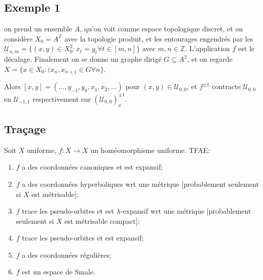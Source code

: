 \documentclass{amsart}
\begin{document}
\subsection{Exemple 1}
on prend un ensemble $A$, qu'on voit comme espace topologique discret, et on consid\`ere $X_0=A^{\mathbb Z}$ avec la topologie produit, et les entourages engendr\'es par les $\mathcal U_{n,m}=\{(x,y)\in X_0^2:x_t=y_t\forall t\in[m,n]\}$ avec $m,n\in\mathbb Z$. L'application $f$ est le d\'ecalage. Finalement on se donne un graphe dirig\'e $G\subseteq A^2$, et on regarde $X=\{x\in X_0:(x_n,x_{n+1}\in G\forall n\}$.

Alors $[x,y]=(\dots,y_{-1},y_0,x_1,x_2,\dots)$ pour $(x,y)\in\mathcal U_{0,0}$, et $f^{\pm1}$ contracte $\mathcal U_{0,0}$ en $\mathcal U_{-1,1}$ respectivement sur $(\mathcal U_{0,0})_x^{\pm1}$.

\subsection{Tra\c{c}age}

\begin{thm}
  Soit $X$ uniforme, $f\colon X\to X$ un hom\'eomorphisme uniforme. TFAE:
  \begin{enumerate}
  \item $f$ a des coordonn\'ees canoniques et est expansif;
  \item $f$ a des coordonn\'ees hyperboliques wrt une m\'etrique [probablement seulement si $X$ est m\'etrisable];
  \item $f$ trace les pseudo-orbites et est $\lambda$-expansif wrt une m\'etrique [probablement seulement si $X$ est m\'etrisable compact];
  \item $f$ trace les pseudo-orbites et est expansif;
  \item $f$ a des coordonn\'ees r\'eguli\`eres;
  \item $f$ est un espace de Smale.
  \end{enumerate}
\end{thm}
\end{document}
